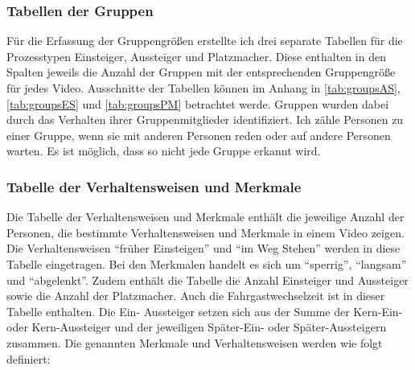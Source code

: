 \subsubsection{Tabellen der Gruppen}
Für die Erfassung der Gruppengrößen erstellte ich drei separate Tabellen für die Prozesstypen Einsteiger, Aussteiger und Platzmacher. Diese enthalten in den Spalten jeweils die Anzahl der Gruppen mit der entsprechenden Gruppengröße für jedes Video. Ausschnitte der Tabellen können im Anhang in \tablename \ref{tab:groupsAS}, \tablename \ref{tab:groupsES} und \tablename \ref{tab:groupsPM} betrachtet werde. Gruppen wurden dabei durch das Verhalten ihrer Gruppenmitglieder identifiziert. Ich zähle Personen zu einer Gruppe, wenn sie mit anderen Personen reden oder auf andere Personen warten. Es ist möglich, dass so nicht jede Gruppe erkannt wird.

\subsubsection{Tabelle der Verhaltensweisen und Merkmale}
Die Tabelle der Verhaltensweisen und Merkmale enthält die jeweilige Anzahl der Personen, die bestimmte Verhaltensweisen und Merkmale in einem Video zeigen. Die Verhaltensweisen "`früher Einsteigen"' und "`im Weg Stehen"' werden in diese Tabelle eingetragen. Bei den Merkmalen handelt es sich um "`sperrig"', "`langsam"' und "`abgelenkt"'. Zudem enthält die Tabelle die Anzahl Einsteiger und Aussteiger sowie die Anzahl der Platzmacher. Auch die Fahrgastwechselzeit ist in dieser Tabelle enthalten. Die Ein- \bzw Aussteiger setzen sich aus der Summe der Kern-Ein- oder Kern-Aussteiger und der jeweiligen Später-Ein- oder Später-Aussteigern zusammen. Die genannten Merkmale und Verhaltensweisen werden wie folgt definiert:

